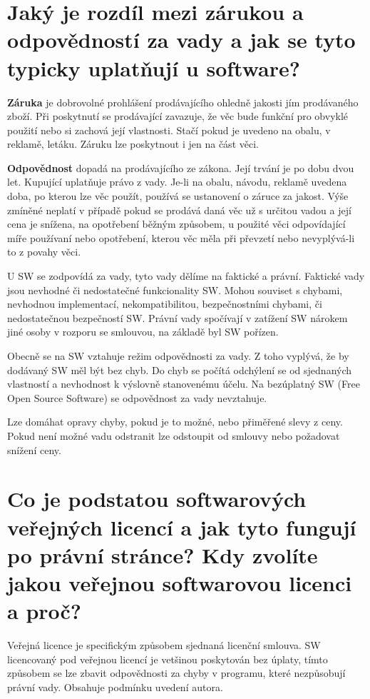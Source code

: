 \newpage
\section{Jaký je rozdíl mezi zárukou a odpovědností za vady a jak se tyto typicky uplatňují u software?}

\textbf{Záruka} je dobrovolné prohlášení prodávajícího ohledně jakosti jím prodávaného zboží. Při poskytnutí se prodávající zavazuje, že věc bude funkční pro obvyklé použití nebo si zachová její vlastnosti. Stačí pokud je uvedeno na obalu, v reklamě, letáku. Záruku lze poskytnout i jen na část věci.

\textbf{Odpovědnost} dopadá na prodávajícího ze zákona. Její trvání je po dobu dvou let. Kupující uplatňuje právo z vady. Je-li na obalu, návodu, reklamě uvedena doba, po kterou lze věc použít, používá se ustanovení o záruce za jakost. Výše zmíněné neplatí v případě pokud se prodává daná věc už s určitou vadou a její cena je snížena, na opotřebení běžným způsobem, u použité věci odpovídající míře používaní nebo opotřebení, kterou věc měla při převzetí nebo nevyplývá-li to z povahy věci.

U SW se zodpovídá za vady, tyto vady dělíme na faktické a právní. Faktické vady jsou nevhodné či nedostatečné funkcionality SW\@. Mohou souviset s chybami, nevhodnou implementací, nekompatibilitou, bezpečnostními chybami, či nedostatečnou bezpečností SW\@. Právní vady spočívají v zatížení SW nárokem jiné osoby v rozporu se smlouvou, na základě byl SW pořízen. 

Obecně se na SW vztahuje režim odpovědnosti za vady. Z toho vyplývá, že by dodávaný SW měl být bez chyb. Do chyb se počítá odchýlení se od sjednaných vlastností a nevhodnost k výslovně stanovenému účelu. Na bezúplatný SW (Free Open Source Software) se odpovědnost za vady nevztahuje.

Lze domáhat opravy chyby, pokud je to možné, nebo přiměřené slevy z ceny. Pokud není možné vadu odstranit lze odstoupit od smlouvy nebo požadovat snížení ceny.


\section{Co je podstatou softwarových veřejných licencí a jak tyto fungují po právní stránce? Kdy zvolíte jakou veřejnou softwarovou licenci a proč?}

Veřejná licence je specifickým způsobem sjednaná licenční smlouva. SW licencovaný pod veřejnou licencí je vetšinou poskytován bez úplaty, tímto způsobem se lze zbavit odpovědnosti za chyby v programu, které nezpůsobují právní vady. Obsahuje podmínku uvedení autora. 


